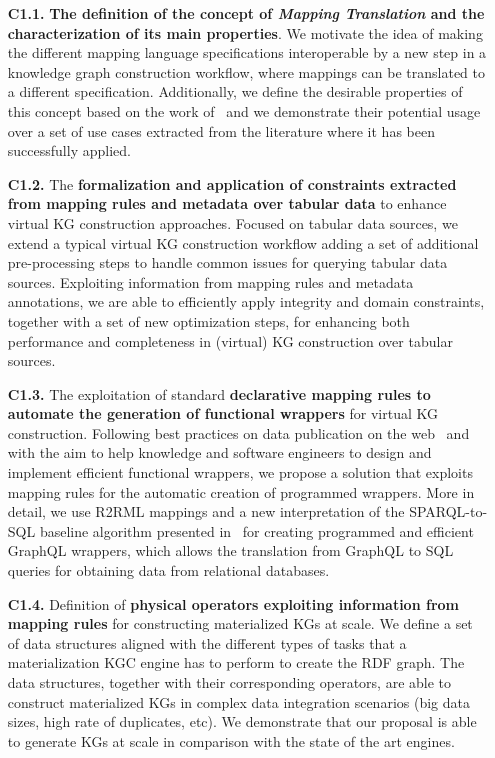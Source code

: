\begin{enumerate}
    \item[\textbf{C1.1.}] \textbf{The definition of the concept of \textit{Mapping Translation} and the characterization of its main properties}. We motivate the idea of making the different mapping language specifications interoperable by a new step in a knowledge graph construction workflow, where mappings can be translated to a different specification. Additionally, we define the desirable properties of this concept based on the work of~\citep{hartig2017foundations} and we demonstrate their potential usage over a set of use cases extracted from the literature where it has been successfully applied.
    \item[\textbf{C1.2.}] The \textbf{formalization and application of constraints extracted from mapping rules and metadata over tabular data} to enhance virtual KG construction approaches. Focused on tabular data sources, we extend a typical virtual KG construction workflow adding a set of additional pre-processing steps to handle common issues for querying tabular data sources. Exploiting information from mapping rules and metadata annotations, we are able to efficiently apply integrity and domain constraints, together with a set of new optimization steps, for enhancing both performance and completeness in (virtual) KG construction over tabular sources.
    \item[\textbf{C1.3.}] The exploitation of standard \textbf{declarative mapping rules to automate the generation of functional wrappers} for virtual KG construction. Following best practices on data publication on the web~\citep{bizer2011linked} and with the aim to help knowledge and software engineers to design and implement efficient functional wrappers, we propose a solution that exploits mapping rules for the automatic creation of programmed wrappers. More in detail, we use R2RML mappings and a new interpretation of the SPARQL-to-SQL baseline algorithm presented in~\citep{chebotko2009semantics} for creating programmed and efficient GraphQL wrappers, which allows the translation from GraphQL to SQL queries for obtaining data from relational databases.
    \item[\textbf{C1.4.}] Definition of \textbf{physical operators exploiting information from mapping rules} for constructing materialized KGs at scale. We define a set of data structures aligned with the different types of tasks that a materialization KGC engine has to perform to create the RDF graph. The data structures, together with their corresponding operators, are able to construct materialized KGs in complex data integration scenarios (big data sizes, high rate of duplicates, etc). We demonstrate that our proposal is able to generate KGs at scale in comparison with the state of the art engines. 

\end{enumerate}
